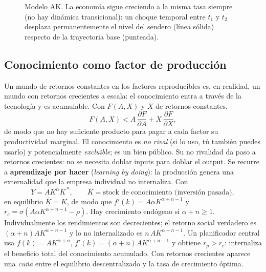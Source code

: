 \documentclass[11pt]{article}
\theoremstyle{definition}
\begin{document}
\begin{figure}[h]
\centering
{}
\caption{Modelo AK. La economía sigue creciendo a la misma tasa siempre (no hay dinámica
transicional): un choque temporal entre $t_{1}$ y $t_{2}$ desplaza permanentemente el nivel del
sendero (línea sólida) respecto de la trayectoria base (punteada).}
\end{figure}


\subsection{Conocimiento como factor de producción}

Un mundo de retornos constantes en los factores reproducibles es, en realidad, un mundo con retornos
crecientes a escala: el conocimiento entra a través de la tecnología y es acumulable. Con $F(A,X)$ y
$X$ de retornos constantes,
\begin{equation}
F(A,X)<A\,\frac{\partial F}{\partial A}+X\,\frac{\partial F}{\partial X},
\end{equation}
de modo que no hay suficiente producto para pagar a cada factor su productividad marginal. El
conocimiento es \emph{no rival} (si lo uso, tú también puedes usarlo) y potencialmente \emph{excluible};
es un bien público. Su no rivalidad da paso a retornos crecientes: no se necesita doblar inputs para
doblar el output. Se recurre a \textbf{aprendizaje por hacer} (\emph{learning by doing}): la producción
genera una externalidad que la empresa individual no internaliza. Con
\begin{equation}
Y=AK^{\alpha}\bar{K}^{\,n},\qquad \bar{K}=\text{stock de conocimiento (inversión pasada)},
\end{equation}
en equilibrio $\bar{K}=K$, de modo que $f'(k)=A\alpha K^{\alpha+n-1}$ y
$r_{c}=\sigma(A\alpha K^{\alpha+n-1}-\rho)$. Hay crecimiento endógeno si $\alpha+n\ge1$.
Individualmente los rendimientos son decrecientes; el retorno social verdadero es
$(\alpha+n)AK^{\alpha+n-1}$ y lo no internalizado es $n\,AK^{\alpha+n-1}$. Un planificador central usa
$f(k)=AK^{\alpha+n}$, $f'(k)=(\alpha+n)AK^{\alpha+n-1}$ y obtiene $r_{p}>r_{c}$: internaliza el
beneficio total del conocimiento acumulado. Con retornos crecientes aparece una \emph{cuña} entre el
equilibrio descentralizado y la tasa de crecimiento óptima.
\end{document}
